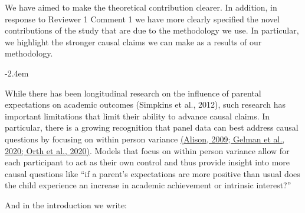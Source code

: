 \documentclass[]{article}
\renewenvironment{quote}{\begin{fquote}\advance\leftmargini -2.4em\begin{oldquote}}{\end{oldquote}\end{fquote}}
\newenvironment{fquote}
  {\def\FrameCommand{
	\fboxsep=0.6em %
	\fcolorbox{black}{white}}%
    \MakeFramed {\advance\hsize-2\width \FrameRestore}
    \begin{minipage}{\linewidth}
  }
  {\end{minipage}\endMakeFramed}
\begin{document}
We have aimed to make the theoretical contribution clearer. In addition, in response to Reviewer 1 Comment 1 we have more clearly specified the novel contributions of the study that are due to the methodology we use. In particular, we highlight the stronger causal claims we can make as a results of our methodology.

\begin{quote}
While there has been longitudinal research on the influence of parental expectations on academic outcomes (Simpkins et al., 2012), such research has important limitations that limit their ability to advance causal claims. In particular, there is a growing recognition that panel data can best address causal questions by focusing on within person variance \href{http://sciwheel.com/work/citation?ids=9360503\&pre=\&suf=\&sa=0}{(Alison, 2009; Gelman et al., 2020; Orth et al., 2020)}. Models that focus on within person variance allow for each participant to act as their own control and thus provide insight into more causal questions like ``if a parent's expectations are more positive than usual does the child experience an increase in academic achievement or intrinsic interest?''
\end{quote}

And in the introduction we write:
\end{document}
